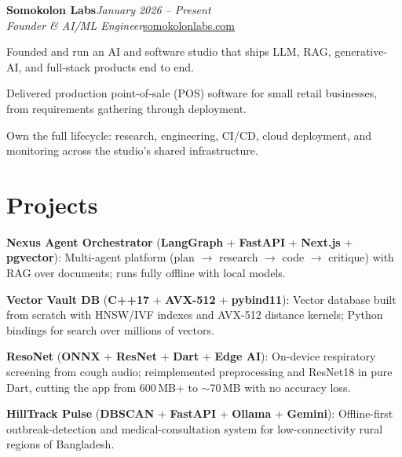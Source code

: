 \documentclass[a4paper,11pt]{article}
\begin{document}
\textbf{Somokolon Labs}\hfill \textit{January 2026 -- Present}\\[1pt]
\textit{Founder \& AI/ML Engineer}\hfill\href{https://somokolonlabs.com}{somokolonlabs.com}
\begin{tight}
    \item Founded and run an AI and software studio that ships LLM, RAG, generative-AI, and full-stack products end to end.
    \item Delivered production point-of-sale (POS) software for small retail businesses, from requirements gathering through deployment.
    \item Own the full lifecycle: research, engineering, CI/CD, cloud deployment, and monitoring across the studio's shared infrastructure.
\end{tight}\vspace{2pt}

\section{Projects}

\begin{tight}
    \item \textbf{Nexus Agent Orchestrator} (\textbf{LangGraph} + \textbf{FastAPI} + \textbf{Next.js} + \textbf{pgvector}): Multi-agent platform (plan $\rightarrow$ research $\rightarrow$ code $\rightarrow$ critique) with RAG over documents; runs fully offline with local models.
    \item \textbf{Vector Vault DB} (\textbf{C++17} + \textbf{AVX-512} + \textbf{pybind11}): Vector database built from scratch with HNSW/IVF indexes and AVX-512 distance kernels; Python bindings for search over millions of vectors.
    \item \textbf{ResoNet} (\textbf{ONNX} + \textbf{ResNet} + \textbf{Dart} + \textbf{Edge AI}): On-device respiratory screening from cough audio; reimplemented preprocessing and ResNet18 in pure Dart, cutting the app from 600\,MB+ to $\sim$70\,MB with no accuracy loss.
    \item \textbf{HillTrack Pulse} (\textbf{DBSCAN} + \textbf{FastAPI} + \textbf{Ollama} + \textbf{Gemini}): Offline-first outbreak-detection and medical-consultation system for low-connectivity rural regions of Bangladesh.
\end{tight}\vspace{2pt}

\end{document}
